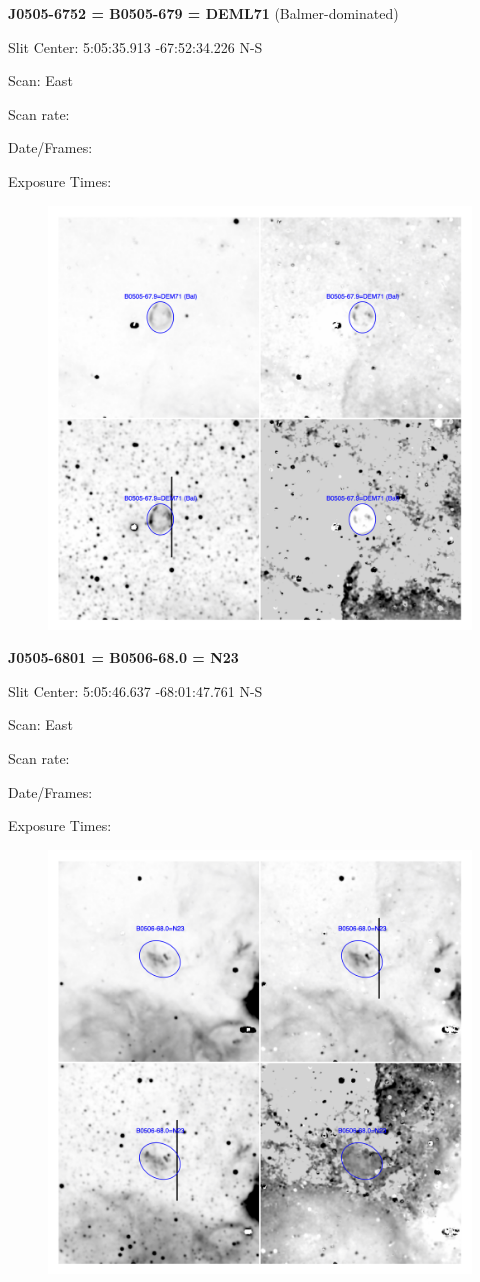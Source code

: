 \documentclass[11pt]{article}
\begin{document}
\newpage
{\bf J0505-6752 = B0505-679 = DEML71}  (Balmer-dominated)

Slit Center:   5:05:35.913    -67:52:34.226     N-S

Scan:  East

Scan rate:  

Date/Frames:

Exposure Times:  

\begin{figure}
\includegraphics[width=11.cm]{snapshots/B0505-679.png}
\end{figure}

\newpage
{\bf J0505-6801 = B0506-68.0 = N23}  
 
Slit Center:   5:05:46.637    -68:01:47.761     N-S

Scan:  East

Scan rate:  

Date/Frames:

Exposure Times:  

\begin{figure}
\includegraphics[width=11.cm]{snapshots/B0506-680.png}
\end{figure}
\end{document}
